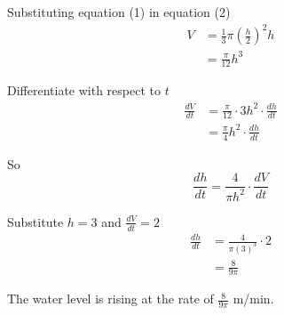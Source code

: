 Substituting equation (1) in equation (2)
\begin{align*}V &  = \frac{1}{3} \pi  \genfrac{(}{)}{}{}{h}{2}^{2} h \\
 &  = \frac{\pi }{12} h^{3}\end{align*}

Differentiate with respect to $t$
\begin{align*}\frac{d V}{d t} &  = \frac{\pi }{12} \cdot 3 h^{2} \cdot \frac{d h}{d t} \\
 &  = \frac{\pi }{4} h^{2} \cdot \frac{d h}{d t}\end{align*}

So
\begin{equation*}\frac{d h}{d t} =\frac{4}{\pi  h^{2}} \cdot \frac{d V}{d t}
\end{equation*}

Substitute $h =3$ and $\frac{d V}{d t} =2$
\begin{align*}\frac{d h}{d t} &  = \frac{4}{\pi  \left (3\right )^{3}} \cdot 2 \\
 &  = \frac{8}{9 \pi }\end{align*}

The water level is rising at the rate of $\frac{8}{9 \pi }$ $\mbox{m}$/$\mbox{min}$. 

